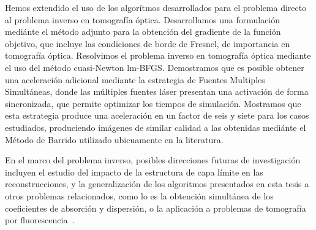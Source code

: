  Hemos extendido el uso de los algorítmos desarrollados 
 para el problema directo al problema inverso en tomografía óptica. 
 Desarrollamos una formulación mediánte el método adjunto para 
 la obtención del gradiente de la función objetivo, que incluye 
 las condiciones de borde de Fresnel, de importancia en tomografía óptica. 
 Resolvimos el problema inverso en tomografía óptica mediante el uso 
 del método cuasi-Newton lm-BFGS.
 Demostramos que es posible obtener una aceleración adicional 
 mediante la estrategia de Fuentes Multiples Simultáneas, 
 donde las múltiples fuentes láser presentan una activación de 
 forma sincronizada, que permite optimizar los tiempos de simulación. 
 Mostramos que esta estrategia produce una aceleración en un factor de 
 seis y siete para los casos estudiados, produciendo imágenes 
 de similar calidad a las obtenidas mediánte el Método de Barrido 
 utilizado ubicuamente en la literatura. 

 En el marco del problema inverso, posibles direcciones futuras 
 de investigación incluyen el estudio del impacto 
 de la estructura de capa límite en las reconstrucciones, 
 y la generalización de los algoritmos presentados en esta tesis 
 a otros problemas relacionados, como lo es la obtención 
 simultánea de los coeficientes de absorción y dispersión, 
 o la aplicación a problemas de tomografía por fluorescencia~\cite{Klose2009,Ren2010}.
